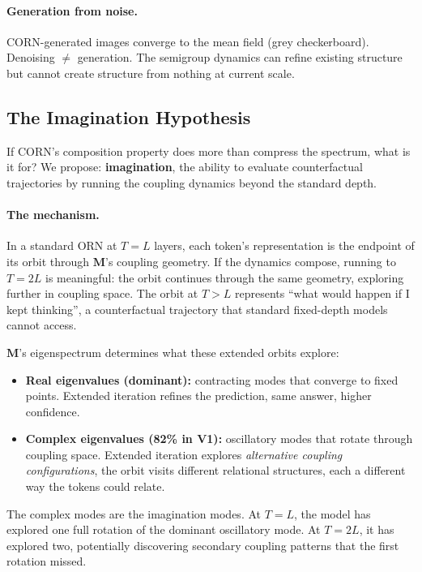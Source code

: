 \documentclass[11pt, a4paper]{article}
\newcommand{\M}{\mathbf{M}}
\theoremstyle{plain}
\theoremstyle{definition}
\theoremstyle{remark}
\begin{document}
\paragraph{Generation from noise.}
CORN-generated images converge to the mean field (grey checkerboard).
Denoising $\neq$ generation.
The semigroup dynamics can refine existing structure but cannot create structure from nothing at current scale.

\subsection{The Imagination Hypothesis}

If CORN's composition property does more than compress the spectrum, what is it for?
We propose: \textbf{imagination}, the ability to evaluate counterfactual trajectories by running the coupling dynamics beyond the standard depth.

\paragraph{The mechanism.}
In a standard ORN at $T{=}L$ layers, each token's representation is the endpoint of its orbit through $\M$'s coupling geometry.
If the dynamics compose, running to $T{=}2L$ is meaningful: the orbit continues through the same geometry, exploring further in coupling space.
The orbit at $T{>}L$ represents ``what would happen if I kept thinking'', a counterfactual trajectory that standard fixed-depth models cannot access.

$\M$'s eigenspectrum determines what these extended orbits explore:
\begin{itemize}[nosep]
    \item \textbf{Real eigenvalues (dominant):} contracting modes that converge to fixed points. Extended iteration refines the prediction, same answer, higher confidence.
    \item \textbf{Complex eigenvalues (82\% in V1):} oscillatory modes that rotate through coupling space. Extended iteration explores \emph{alternative coupling configurations}, the orbit visits different relational structures, each a different way the tokens could relate.
\end{itemize}

The complex modes are the imagination modes.
At $T{=}L$, the model has explored one full rotation of the dominant oscillatory mode.
At $T{=}2L$, it has explored two, potentially discovering secondary coupling patterns that the first rotation missed.
\end{document}
